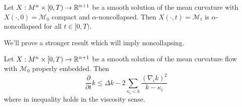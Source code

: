 \begin{thm}[Noncollapsing]
    Let $ X: M^{n} \times [0,T) \to \mathbb{R}^{n+1} $ be a smooth solution of the mean curvature with $ X(\cdot, 0) = \mathcal{M}_{0} $ compact and $ \alpha $-noncollapsed. Then $ X(\cdot,t) = \mathcal{M}_{t} $ is $ \alpha $-noncollapsed for all $t \in [0,T)  $.  
\end{thm}

We'll prove a stronger result which will imply noncollapsing. 

\begin{thm}
    Let $ X : M^{n} \times [0,T) \to \mathbb{R}^{n+1} $ be a smooth solution of the mean curvature flow with $ \mathcal{M}_{0} $ properly embedded. Then \begin{equation}
        \frac{\partial}{ \partial t}k \le \Delta k -2 \sum_{\kappa_{i}<k}^{} \frac{(\nabla_{i}k)^{2}}{k- \kappa_{i}} 
    \end{equation}
    where in inequality holds in the viscosity sense. 
\end{thm}